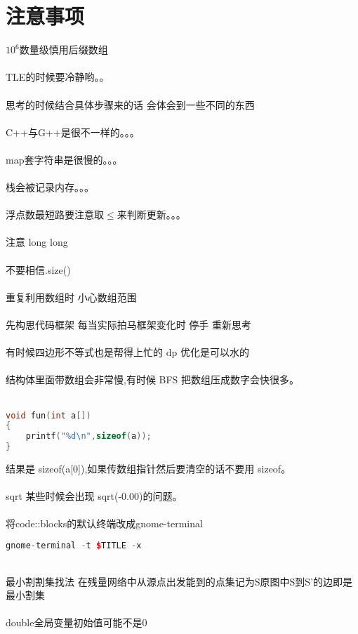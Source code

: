 \section{注意事项}
	$10^{6}$数量级慎用后缀数组\\
	\\
	TLE的时候要冷静哟。。\\
	\\
	思考的时候结合具体步骤来的话 会体会到一些不同的东西\\
	\\
	C++与G++是很不一样的。。。\\
	\\
	map套字符串是很慢的。。。\\ 
	\\
	栈会被记录内存。。。\\
	\\
	浮点数最短路要注意取$\leq$来判断更新。。。\\
	\\
	注意 long long\\
	\\
	不要相信.size()\\
	\\
	重复利用数组时 小心数组范围\\
	\\
	先构思代码框架 每当实际拍马框架变化时 停手 重新思考\\
	\\
	有时候四边形不等式也是帮得上忙的 dp 优化是可以水的\\
	\\
	结构体里面带数组会非常慢,有时候 BFS 把数组压成数字会快很多。\\
	\\
	\begin{lstlisting}[language=c++]
void fun(int a[])
{
	printf("%d\n",sizeof(a));
}
	\end{lstlisting}
	结果是 sizeof(a[0]),如果传数组指针然后要清空的话不要用 sizeof。\\
	\\
	sqrt 某些时候会出现 sqrt(-0.00)的问题。\\
	\\
	将code::blocks的默认终端改成gnome-terminal
	\begin{lstlisting}[language=c++]
gnome-terminal -t $TITLE -x
	\end{lstlisting}
	~\\
	最小割割集找法 在残量网络中从源点出发能到的点集记为S原图中S到S’的边即是最小割集\\
	\\
	double全局变量初始值可能不是$0$\\
